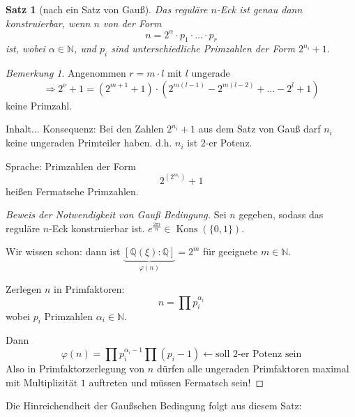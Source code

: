 \documentclass[a4paper,12pt,numbers=noenddot,parskip=full]{scrartcl}
\newcommand{\setN}{\mathbb{N}}
\newcommand{\setQ}{\mathbb{Q}}
\theoremstyle{dotless}
\newtheorem{theorem}{Satz}[section]
\theoremstyle{remark}
\newtheorem*{remark}{Bemerkung}
\begin{document}
	\begin{theorem}[nach ein Satz von Gauß]
		Das reguläre $n$-Eck ist genau dann konstruierbar, wenn $n$ von der Form
		\begin{equation*}
			n = 2^\alpha \cdot p_1 \cdot \dots \cdot p_r
		\end{equation*}
		ist, wobei $\alpha \in \setN$, und $p_i$ sind unterschiedliche Primzahlen der Form $2^{n_i} + 1$.
	\end{theorem}

	\begin{remark}
		Angenommen $r = m \cdot l$ mit $l$ ungerade
		\begin{equation*}
			\Rightarrow 2^{\nu} + 1 = (2^{m+1} + 1) \cdot (2^{m(l-1)} - 2^{m(l-2)} + \dots - 2^l + 1)
		\end{equation*}
		keine Primzahl.
			
		Inhalt...
		Konsequenz: Bei den Zahlen $2^{n_i} + 1$ aus dem Satz von Gauß darf $n_i$ keine ungeraden Primteiler haben. d.h. $n_i$ ist $2$-er Potenz.
		
		Sprache: Primzahlen der Form
		\begin{equation*}
			2^{(2^{m_i})} + 1
		\end{equation*}
		heißen Fermatsche Primzahlen.
	\end{remark}

	\begin{proof}[Beweis der Notwendigkeit von Gauß Bedingung]
		Sei $n$ gegeben, sodass das reguläre $n$-Eck konstruierbar ist. $e^{\frac{2\pi i}{n}} \in \operatorname{Kons}(\{ 0, 1 \})$.
		
		Wir wissen schon: dann ist $\underbrace{[\setQ(\xi): \setQ]}_{\varphi(n)} = 2^m$ für geeignete $m \in \setN$.
		
		Zerlegen $n$ in Primfaktoren:
		\begin{equation*}
			n = \prod p_i^{\alpha_i}
		\end{equation*}
		wobei $p_i$ Primzahlen $\alpha_i \in \setN$.
		
		Dann
		\begin{equation*}
			\varphi(n) = \prod p_i^{\alpha_i - 1} \prod (p_i - 1) \leftarrow \text{soll $2$-er Potenz sein}
		\end{equation*}
		Also in Primfaktorzerlegung von $n$ dürfen alle ungeraden Primfaktoren maximal mit Multiplizität $1$ auftreten und müssen Fermatsch sein!
	\end{proof}

	Die Hinreichendheit der Gaußschen Bedingung folgt aus diesem Satz:
	
\end{document}
